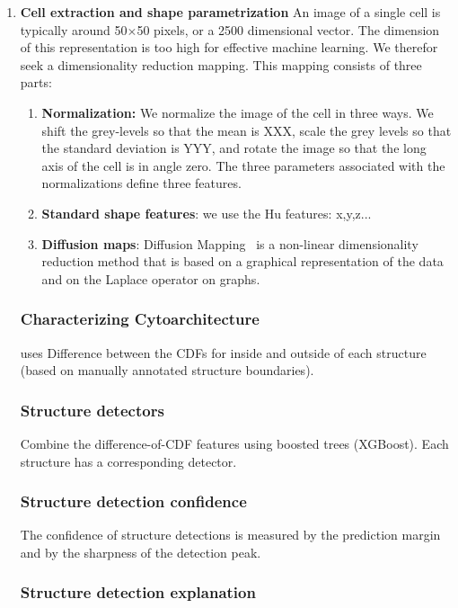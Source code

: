 \documentclass[runningheads]{llncs}
\begin{document}
\begin{enumerate}
\item{\bf Cell extraction and shape parametrization}
An image of a single cell is typically around 50$\times$50 pixels, or a 2500 dimensional vector. The dimension of this representation is too high for effective machine learning. We therefor seek a dimensionality reduction mapping. This mapping consists of three parts:
\begin{enumerate}
    \item {\bf Normalization:} We normalize the image of the cell in three ways. We 
    shift the grey-levels so that the mean is XXX, scale the grey levels so that the standard deviation is YYY, and rotate the image so that the long axis of the cell is in angle zero. The three parameters associated with the normalizations define three features.
    \item {\bf Standard shape features}: we use the Hu features: x,y,z...
    \item{ \bf  Diffusion maps}: Diffusion Mapping~\cite{Belkin,
        Coifman} is a non-linear dimensionality reduction method that
      is based on a graphical representation of the data and on the
      Laplace operator on graphs.
      \end{enumerate}
\subsubsection{ Characterizing Cytoarchitecture} uses Difference between the CDFs for inside and outside of each structure (based on manually annotated structure boundaries). 
\subsubsection { Structure detectors} Combine the difference-of-CDF features using boosted trees (XGBoost). Each structure has a corresponding detector.
\subsubsection { Structure detection confidence} The confidence of structure
  detections is measured by the prediction margin and by the sharpness
  of the detection peak.
\subsubsection { Structure detection explanation}

\end{enumerate}
\end{document}
